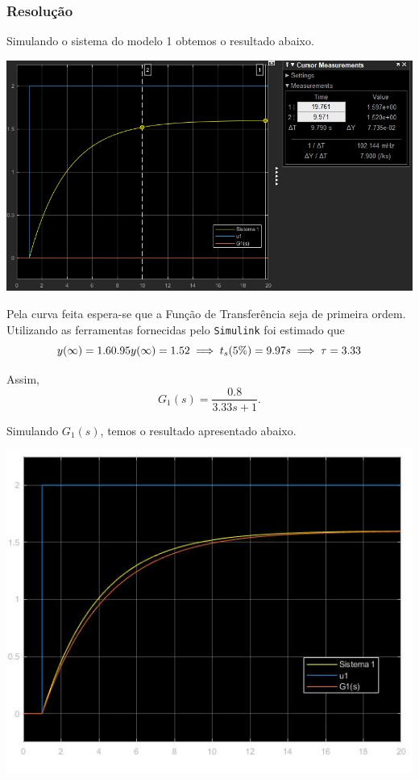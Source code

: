 \documentclass[
]{book}
\theoremstyle{definition}
\theoremstyle{definition}
\theoremstyle{definition}
\theoremstyle{remark}
\begin{document}
\hypertarget{resoluuxe7uxe3o-6}{%
\subsubsection*{Resolução}\label{resoluuxe7uxe3o-6}}

Simulando o sistema do modelo 1 obtemos o resultado abaixo.

\includegraphics{Imagens/Lab3/Resolução/prob1A.jpg}

Pela curva feita espera-se que a Função de Transferência seja de primeira ordem. Utilizando as ferramentas fornecidas pelo \texttt{Simulink} foi estimado que
\[
y(\infty) = 1.6 \\ 
0.95y(\infty) = 1.52 \implies  t_s(5\%) = 9.97s \implies \tau = 3.33
\]

Assim,
\[
G_1(s) = \frac {0.8}{3.33s+1}.
\]

Simulando \(G_1(s)\), temos o resultado apresentado abaixo.

\includegraphics{Imagens/Lab3/Resolução/prob1B.jpg}
\end{document}
